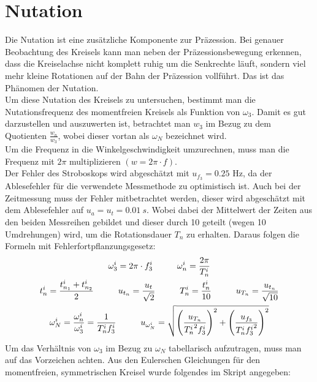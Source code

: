 

\section{Nutation}

Die Nutation ist eine zusätzliche Komponente zur Präzession. Bei genauer Beobachtung des Kreisels kann man neben der Präzessionsbewegung erkennen, dass die Kreiselachse nicht komplett ruhig um die Senkrechte läuft, sondern viel mehr kleine Rotationen auf der Bahn der Präzession vollführt. Das ist das Phänomen der Nutation.\\
Um diese Nutation des Kreisels zu untersuchen, bestimmt man die Nutationsfrequenz des momentfreien Kreisels als Funktion von $\omega_3$. Damit es gut darzustellen und auszuwerten ist, betrachtet man $w_3$ im Bezug zu dem Quotienten $\frac{w_n}{w_3}$, wobei dieser vortan als $\omega_N$ bezeichnet wird. \\
Um die Frequenz in die Winkelgeschwindigkeit umzurechnen, muss man die Frequenz mit $2\pi$ multiplizieren $(w =2\pi\cdot f)$.\\
Der Fehler des Stroboskops wird abgeschätzt mit $u_{f_3}=0.25$ Hz, da der Ablesefehler für die verwendete Messmethode zu optimistisch ist. 
Auch bei der Zeitmessung muss der Fehler mitbetrachtet werden, dieser wird abgeschätzt mit dem Ablesefehler auf $u_a=u_t=0.01~s$. Wobei dabei der Mittelwert der Zeiten aus den beiden Messreihen gebildet und dieser durch 10 geteilt (wegen 10 Umdrehungen) wird, um die Rotationsdauer $T_n$ zu erhalten. Daraus folgen die Formeln mit Fehlerfortpflanzungsgesetz:
\begin{gather}
    \omega_3^i=2\pi\cdot f_3^i  \tab \omega_n^i = \frac{2\pi}{T_n^i}\\
    t_n^i = \frac{t_{n_1}^i+t_{n_2}^i}{2}\tab u_{t_n} = \frac{u_t}{\sqrt{2}} \tab T_n^i=\frac{t_n^i}{10} \tab u_{T_n} = \frac{u_{t_n}}{\sqrt{10}}\\[0.3mm]
    \omega_N^i=\frac{\omega_n^i}{\omega_3^i} = \frac{1}{T_n^i f_3^i} 
    \tab u_{\omega_N^i} = \sqrt{\left(\frac{u_{T_n}}{{T_n^i}^2f_3^i}\right)^2+\left(\frac{u_{f_3}}{T_n^i{f_3^i}^2}\right)^2} 
\end{gather}
Um das Verhältnis von $\omega_3$ im Bezug zu $\omega_N$ tabellarisch aufzutragen, muss man auf das Vorzeichen achten. Aus den Eulerschen Gleichungen für den momentfreien, symmetrischen Kreisel wurde folgendes im Skript angegeben:
